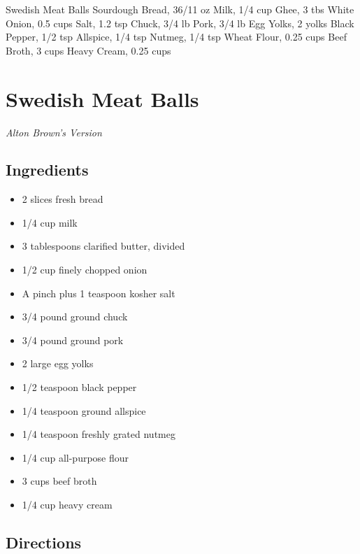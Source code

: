 Swedish Meat Balls
  Sourdough Bread, 36/11 oz
  Milk, 1/4 cup
  Ghee, 3 tbs
  White Onion, 0.5 cups
  Salt, 1.2 tsp
  Chuck, 3/4 lb
  Pork, 3/4 lb
  Egg Yolks, 2 yolks
  Black Pepper, 1/2 tsp
  Allspice, 1/4 tsp
  Nutmeg, 1/4 tsp
  Wheat Flour, 0.25 cups
  Beef Broth, 3 cups
  Heavy Cream, 0.25 cups

\section{ Swedish Meat Balls }
\textit{ Alton Brown's Version }

\subsection{ Ingredients }

\begin{itemize}
  \item 2 slices fresh bread
  \item 1/4 cup milk
  \item 3 tablespoons clarified butter, divided
  \item 1/2 cup finely chopped onion
  \item A pinch plus 1 teaspoon kosher salt
  \item 3/4 pound ground chuck
  \item 3/4 pound ground pork
  \item 2 large egg yolks
  \item 1/2 teaspoon black pepper
  \item 1/4 teaspoon ground allspice
  \item 1/4 teaspoon freshly grated nutmeg
  \item 1/4 cup all-purpose flour
  \item 3 cups beef broth
  \item 1/4 cup heavy cream

\end{itemize}

\subsection{ Directions }

